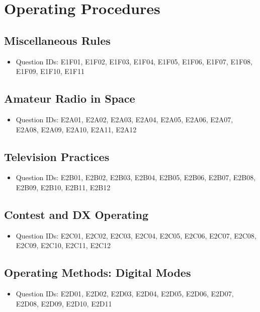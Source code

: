 \documentclass{book}
\begin{document}
\chapter{Operating Procedures}
\section{Miscellaneous Rules}
\begin{itemize}
    \item Question IDs: E1F01, E1F02, E1F03, E1F04, E1F05, E1F06, E1F07, E1F08, E1F09, E1F10, E1F11
\end{itemize}

\section{Amateur Radio in Space}
\begin{itemize}
    \item Question IDs: E2A01, E2A02, E2A03, E2A04, E2A05, E2A06, E2A07, E2A08, E2A09, E2A10, E2A11, E2A12
\end{itemize}

\section{Television Practices}
\begin{itemize}
    \item Question IDs: E2B01, E2B02, E2B03, E2B04, E2B05, E2B06, E2B07, E2B08, E2B09, E2B10, E2B11, E2B12
\end{itemize}

\section{Contest and DX Operating}
\begin{itemize}
    \item Question IDs: E2C01, E2C02, E2C03, E2C04, E2C05, E2C06, E2C07, E2C08, E2C09, E2C10, E2C11, E2C12
\end{itemize}

\section{Operating Methods: Digital Modes}
\begin{itemize}
    \item Question IDs: E2D01, E2D02, E2D03, E2D04, E2D05, E2D06, E2D07, E2D08, E2D09, E2D10, E2D11
\end{itemize}
\end{document}
